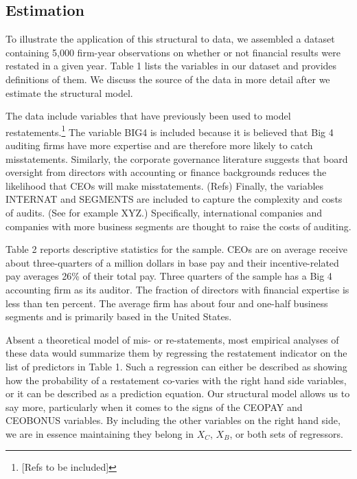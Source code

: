 \subsection{Estimation}

To illustrate the application of this structural to data, we assembled a dataset containing 
5,000 firm-year observations on whether or not financial results were restated in a given year.
Table 1 lists the variables in our dataset and provides definitions of them. 
We discuss the source of the data in more detail after we estimate the structural model. 

The data include variables that have previously been used to model restatements.\footnote{[Refs to be included]} The variable BIG4 is included 
because it is believed that Big 4 auditing firms have more expertise and are therefore more likely
to catch misstatements. Similarly, the corporate governance literature suggests that board oversight 
from directors with accounting or finance backgrounds reduces the likelihood that CEOs will 
make misstatements. (Refs) Finally, the variables INTERNAT and 
SEGMENTS are included to capture the complexity and costs of audits. (See for example
XYZ.) Specifically, international companies and companies with more business segments are 
thought to raise the costs of auditing. 

Table 2 reports descriptive statistics for the sample. CEOs are on average receive about three-quarters
of a million dollars in base pay and their incentive-related pay averages 26\% of their total pay.
Three quarters of the sample has a Big 4 accounting firm as its auditor. The fraction of directors
with financial expertise is less than ten percent. The average firm has about four and one-half
business segments and is primarily based in the United States.

Absent a theoretical model of mis- or re-statements, most empirical
analyses of these data would summarize them by regressing the restatement
indicator on the list of predictors in Table 1. Such a regression can either be described
as showing how the probability of a restatement co-varies with the right hand side variables,
or it can be described as a prediction equation. Our structural model allows us to say more,
particularly when it comes to the signs of the CEOPAY and CEOBONUS variables. By including
the other variables on the right hand side, we are in essence maintaining they belong in
$X_C$, $X_B$, or both sets of regressors.

